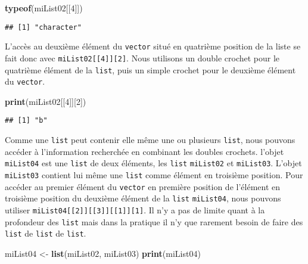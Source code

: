 \documentclass[]{book}
\newenvironment{Shaded}{\begin{snugshade}}{\end{snugshade}}
\newcommand{\KeywordTok}[1]{\textcolor[rgb]{0.13,0.29,0.53}{\textbf{#1}}}
\newcommand{\DecValTok}[1]{\textcolor[rgb]{0.00,0.00,0.81}{#1}}
\newcommand{\StringTok}[1]{\textcolor[rgb]{0.31,0.60,0.02}{#1}}
\newcommand{\NormalTok}[1]{#1}
\theoremstyle{definition}
\theoremstyle{definition}
\theoremstyle{definition}
\theoremstyle{remark}
\begin{document}
\begin{Shaded}
\begin{Highlighting}[]
\KeywordTok{typeof}\NormalTok{(miList02[[}\DecValTok{4}\NormalTok{]])}
\end{Highlighting}
\end{Shaded}

\begin{verbatim}
## [1] "character"
\end{verbatim}

L'accès au deuxième élément du \texttt{vector} situé en quatrième
position de la liste se fait donc avec
\texttt{miList02{[}{[}4{]}{]}{[}2{]}}. Nous utilisons un double crochet
pour le quatrième élément de la \texttt{list}, puis un simple crochet
pour le deuxième élément du \texttt{vector}.

\begin{Shaded}
\begin{Highlighting}[]
\KeywordTok{print}\NormalTok{(miList02[[}\DecValTok{4}\NormalTok{]][}\DecValTok{2}\NormalTok{])}
\end{Highlighting}
\end{Shaded}

\begin{verbatim}
## [1] "b"
\end{verbatim}

Comme une \texttt{list} peut contenir elle même une ou plusieurs
\texttt{list}, nous pouvons accéder à l'information recherchée en
combinant les doubles crochets. l'objet \texttt{miList04} est une
\texttt{list} de deux éléments, les \texttt{list} \texttt{miList02} et
\texttt{miList03}. L'objet \texttt{miList03} contient lui même une
\texttt{list} comme élément en troisième position. Pour accéder au
premier élément du \texttt{vector} en première position de l'élément en
troisième position du deuxième élément de la \texttt{list}
\texttt{miList04}, nous pouvons utiliser
\texttt{miList04{[}{[}2{]}{]}{[}{[}3{]}{]}{[}{[}1{]}{]}{[}1{]}}. Il n'y
a pas de limite quant à la profondeur des \texttt{list} mais dans la
pratique il n'y que rarement besoin de faire des \texttt{list} de
\texttt{list} de \texttt{list}.

\begin{Shaded}
\begin{Highlighting}[]
\NormalTok{miList04 <-}\StringTok{ }\KeywordTok{list}\NormalTok{(miList02, miList03)}
\KeywordTok{print}\NormalTok{(miList04)}
\end{Highlighting}
\end{Shaded}
\end{document}
